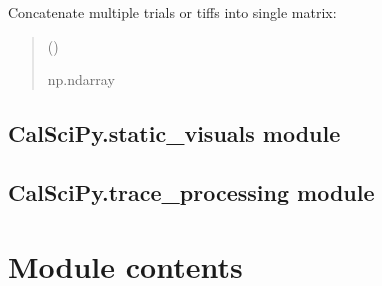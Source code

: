 \documentclass[letterpaper,10pt,english]{sphinxmanual}
\begin{document}
\begin{fulllineitems}
\label{\detokenize{CalSciPy.reorganization:CalSciPy.reorganization.merge_traces}}
\pysigstartsignatures
{}
\pysigstopsignatures
\sphinxAtStartPar
Concatenate multiple trials or tiffs into single matrix:
\begin{quote}\begin{description}
\sphinxAtStartPar
{} () \sphinxhyphen{}\sphinxhyphen{} 

\sphinxAtStartPar


\sphinxAtStartPar
np.ndarray

\end{description}\end{quote}

\end{fulllineitems}


\sphinxstepscope


\subsection{CalSciPy.static\_visuals module}
\label{\detokenize{CalSciPy.static_visuals:module-CalSciPy.static_visuals}}\label{\detokenize{CalSciPy.static_visuals:calscipy-static-visuals-module}}\label{\detokenize{CalSciPy.static_visuals::doc}}
\sphinxstepscope


\subsection{CalSciPy.trace\_processing module}
\label{\detokenize{CalSciPy.trace_processing:module-CalSciPy.trace_processing}}\label{\detokenize{CalSciPy.trace_processing:calscipy-trace-processing-module}}\label{\detokenize{CalSciPy.trace_processing::doc}}

\section{Module contents}
\label{\detokenize{CalSciPy:module-CalSciPy}}\label{\detokenize{CalSciPy:module-contents}}
\sphinxstepscope
\end{document}
